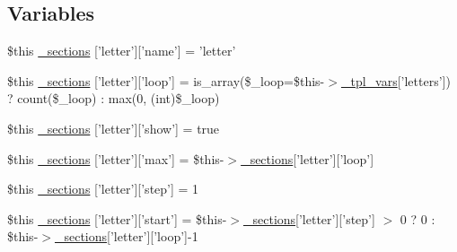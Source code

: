 \subsection*{\-Variables}
\begin{DoxyCompactItemize}
\item 
\$this \hyperlink{media_234d6fa4bfd5eef6424a9ddc74a166350_2_06_06-19_05_06_06-1910644431_05basicindex_8tpl_8php_ab61c28556ae2c3aa9f08b3c37b8d1dee}{\-\_\-sections} \mbox{[}'letter'\mbox{]}\mbox{[}'name'\mbox{]} = 'letter'
\item 
\$this \hyperlink{media_234d6fa4bfd5eef6424a9ddc74a166350_2_06_06-19_05_06_06-1910644431_05basicindex_8tpl_8php_ae48204adfd4d0ee93936b1c80c177329}{\-\_\-sections} \mbox{[}'letter'\mbox{]}\mbox{[}'loop'\mbox{]} = is\-\_\-array(\$\-\_\-loop=\$this-\/$>$\hyperlink{_06_06127_05_06_0612781687_05pkgelementindex_8tpl_8php_a4a4846d8e68d455590131a05697f67a3}{\-\_\-tpl\-\_\-vars}\mbox{[}'letters'\mbox{]}) ? count(\$\-\_\-loop) \-: max(0, (int)\$\-\_\-loop)
\item 
\$this \hyperlink{media_234d6fa4bfd5eef6424a9ddc74a166350_2_06_06-19_05_06_06-1910644431_05basicindex_8tpl_8php_a0df4abbde93015148031ad45c6ab77dd}{\-\_\-sections} \mbox{[}'letter'\mbox{]}\mbox{[}'show'\mbox{]} = true
\item 
\$this \hyperlink{media_234d6fa4bfd5eef6424a9ddc74a166350_2_06_06-19_05_06_06-1910644431_05basicindex_8tpl_8php_a37080233bfe88cede401c74aaa2c203d}{\-\_\-sections} \mbox{[}'letter'\mbox{]}\mbox{[}'max'\mbox{]} = \$this-\/$>$\hyperlink{_06_06127_05_06_0612781687_05pkgelementindex_8tpl_8php_a9e3d26b39edfe29c3f29b8035ef33828}{\-\_\-sections}\mbox{[}'letter'\mbox{]}\mbox{[}'loop'\mbox{]}
\item 
\$this \hyperlink{media_234d6fa4bfd5eef6424a9ddc74a166350_2_06_06-19_05_06_06-1910644431_05basicindex_8tpl_8php_a6337b688bdd972398487eb8159a4990b}{\-\_\-sections} \mbox{[}'letter'\mbox{]}\mbox{[}'step'\mbox{]} = 1
\item 
\$this \hyperlink{media_234d6fa4bfd5eef6424a9ddc74a166350_2_06_06-19_05_06_06-1910644431_05basicindex_8tpl_8php_a024abd6dfcb3c2d12aa3af3d9e5e2f7a}{\-\_\-sections} \mbox{[}'letter'\mbox{]}\mbox{[}'start'\mbox{]} = \$this-\/$>$\hyperlink{_06_06127_05_06_0612781687_05pkgelementindex_8tpl_8php_a9e3d26b39edfe29c3f29b8035ef33828}{\-\_\-sections}\mbox{[}'letter'\mbox{]}\mbox{[}'step'\mbox{]} $>$ 0 ? 0 \-: \$this-\/$>$\hyperlink{_06_06127_05_06_0612781687_05pkgelementindex_8tpl_8php_a9e3d26b39edfe29c3f29b8035ef33828}{\-\_\-sections}\mbox{[}'letter'\mbox{]}\mbox{[}'loop'\mbox{]}-\/1

\end{DoxyCompactItemize}
